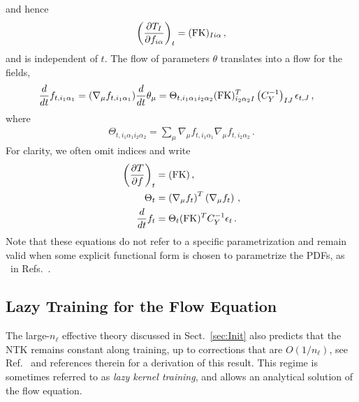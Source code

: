\documentclass[11pt]{article}
\begin{document}
and hence
\begin{align}
    \label{eq:dTbydf}
    \left(\frac{\partial T_I}{\partial f_{i\alpha}}\right)_t =
        (\mathrm{FK})_{Ii\alpha}\, ,
\end{align}
and is independent of $t$. The flow of parameters $\theta$ translates into a flow for the fields,
\begin{align}
    \label{eq:NTKFlow}
    \frac{d}{dt} &f_{t,i_1\alpha_1} = (\nabla_\mu f_{t,i_1\alpha_1}) \frac{d}{dt} \theta_\mu =
      \Theta_{t,i_1\alpha_1i_2\alpha_2}
      (\mathrm{FK})^T_{i_2\alpha_2I} \left(C_Y^{-1}\right)_{IJ} \epsilon_{t,J}\, ,
\end{align}
where
\begin{align}
    \label{eq:NTKDef}
    \Theta_{t,i_1\alpha_1i_2\alpha_2} = \sum_\mu
    \nabla_\mu f_{t,i_1\alpha_1} \nabla_\mu f_{t,i_2\alpha_2}\, .
\end{align}
For clarity, we often omit indices and write
\begin{align}
    \left(\frac{\partial T}{\partial f}\right)_t
        &= (\mathrm{FK})\, , \\
    \Theta_t
        &= \left(\nabla_\mu f_t\right)^T \left(\nabla_\mu f_t\right)\, , \\
    \label{eq:FlowEquationNoIndices}
    \frac{d}{dt} f_t
        &= \Theta_t (\mathrm{FK})^T C_Y^{-1} \epsilon_t\, .
\end{align}
Note that these equations do not refer to a specific parametrization and remain valid when some
explicit functional form is chosen to parametrize the PDFs, as \eg\ in
Refs.~\cite{Bailey:2020ooq,Hou:2019efy}.

\subsection{Lazy Training for the Flow Equation}
\label{sec:Lazy}

The large-$n_{\ell}$ effective theory discussed in Sect.~\ref{sec:Init} also predicts that
the NTK remains constant along training, up to corrections that are $O(1/n_{\ell})$, see
Ref.~\cite{DBLP:journals/corr/abs-1806-07572} and references therein for a derivation of this result.
This regime is sometimes referred to as {\em lazy kernel training}, and allows an analytical
solution of the flow equation.
\end{document}
